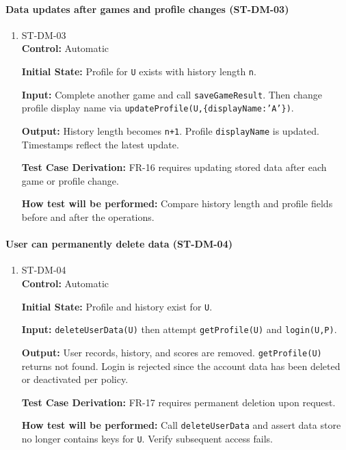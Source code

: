 \documentclass[12pt, titlepage]{article}
\begin{document}
\paragraph{Data updates after games and profile changes (ST-DM-03)}
\begin{enumerate}
\item{ST-DM-03\\}
\textbf{Control:} Automatic

\textbf{Initial State:} Profile for \texttt{U} exists with history length \texttt{n}.

\textbf{Input:} Complete another game and call \texttt{saveGameResult}. Then change profile display name via \texttt{updateProfile(U,\{displayName:'A'\})}.

\textbf{Output:} History length becomes \texttt{n+1}. Profile \texttt{displayName} is updated. Timestamps reflect the latest update.

\textbf{Test Case Derivation:} FR-16 requires updating stored data after each game or profile change.

\textbf{How test will be performed:} Compare history length and profile fields before and after the operations.
\end{enumerate}

\paragraph{User can permanently delete data (ST-DM-04)}
\begin{enumerate}
\item{ST-DM-04\\}
\textbf{Control:} Automatic

\textbf{Initial State:} Profile and history exist for \texttt{U}.

\textbf{Input:} \texttt{deleteUserData(U)} then attempt \texttt{getProfile(U)} and \texttt{login(U,P)}.

\textbf{Output:} User records, history, and scores are removed. \texttt{getProfile(U)} returns not found. Login is rejected since the account data has been deleted or deactivated per policy.

\textbf{Test Case Derivation:} FR-17 requires permanent deletion upon request.

\textbf{How test will be performed:} Call \texttt{deleteUserData} and assert data store no longer contains keys for \texttt{U}. Verify subsequent access fails.
\end{enumerate}
\end{document}

